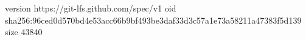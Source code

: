 version https://git-lfs.github.com/spec/v1
oid sha256:96ced0d570bd4e53acc66b9bf493be3daf33d3c57a1e73a58211a47383f5d139
size 43840
